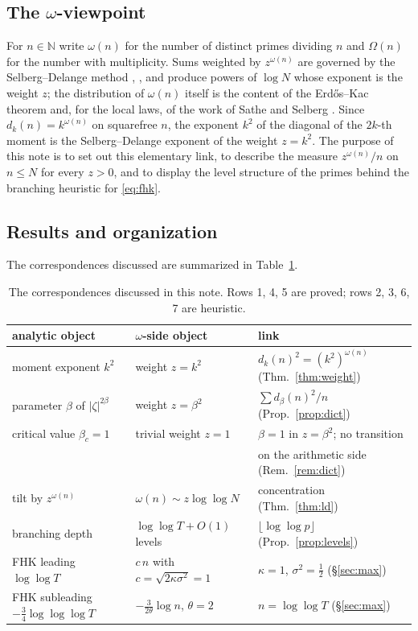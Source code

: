 \documentclass[11pt]{amsart}
\theoremstyle{definition}
\newcommand{\NN}{\mathbb N}
\newcommand{\half}{\tfrac12}
\newcommand{\dk}{d_k}
\newcommand{\loglog}{\log\log}
\newcommand{\llll}{\log\log\log}
\begin{document}
\subsection{The \texorpdfstring{$\omega$}{omega}-viewpoint}
For $n\in\NN$ write $\omega(n)$ for the number of distinct primes dividing $n$ and $\Omega(n)$ for the number
with multiplicity. Sums weighted by $z^{\omega(n)}$ are governed by the Selberg--Delange method
\cite{SelbergSathe,Delange}, \cite[Ch.~II.5]{Tenenbaum}, and produce powers of $\log N$ whose exponent is the
weight $z$; the distribution of $\omega(n)$ itself is the content of the Erd\H{o}s--Kac theorem \cite{ErdosKac}
and, for the local laws, of the work of Sathe and Selberg \cite{Sathe,SelbergSathe}. Since
$\dk(n)=k^{\omega(n)}$ on squarefree $n$, the exponent $k^2$ of the diagonal of the $2k$-th moment is the
Selberg--Delange exponent of the weight $z=k^2$. The purpose of this note is to set out this elementary link, to
describe the measure $z^{\omega(n)}/n$ on $n\le N$ for every $z>0$, and to display the level structure of the
primes behind the branching heuristic for \eqref{eq:fhk}.

\subsection{Results and organization}
The correspondences discussed are summarized in Table~\ref{tab:dictionary}.

\begin{table}[ht]
\centering
\renewcommand{\arraystretch}{1.2}
\begin{tabular}{lll}
\toprule
analytic object & $\omega$-side object & link \\
\midrule
moment exponent $k^2$ & weight $z=k^2$ & $\dk(n)^2=(k^2)^{\omega(n)}$ (Thm.~\ref{thm:weight}) \\
parameter $\beta$ of $|\zeta|^{2\beta}$ & weight $z=\beta^2$ & $\sum d_\beta(n)^2/n$
(Prop.~\ref{prop:dict}) \\
critical value $\beta_c=1$ & trivial weight $z=1$ & $\beta=1$ in $z=\beta^2$; no transition \\
 & & on the arithmetic side (Rem.~\ref{rem:dict}) \\
tilt by $z^{\omega(n)}$ & $\omega(n)\sim z\loglog N$ & concentration (Thm.~\ref{thm:ld}) \\
branching depth & $\loglog T+O(1)$ levels & $\lfloor\loglog p\rfloor$ (Prop.~\ref{prop:levels}) \\
FHK leading $\loglog T$ & $c\,n$ with $c=\sqrt{2\kappa\sigma^2}=1$ & $\kappa=1$, $\sigma^2=\half$
(\S\ref{sec:max}) \\
FHK subleading $-\tfrac34\llll T$ & $-\frac{3}{2\theta}\log n$, $\theta=2$ & $n=\loglog T$ (\S\ref{sec:max}) \\
\bottomrule
\end{tabular}
\caption{The correspondences discussed in this note. Rows 1, 4, 5 are proved; rows 2, 3, 6, 7 are heuristic.}
\label{tab:dictionary}
\end{table}
\end{document}
